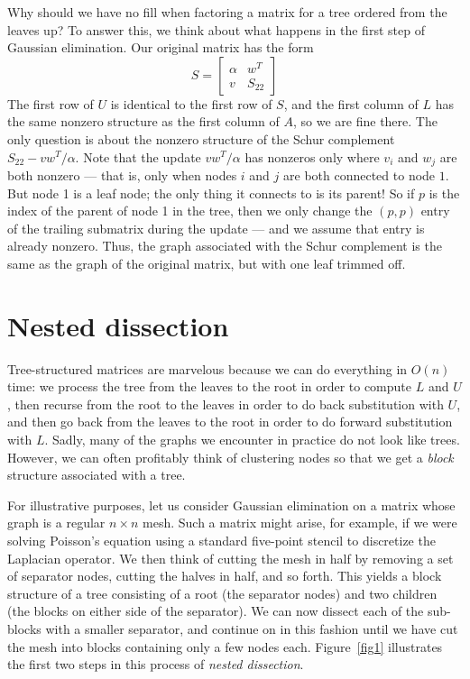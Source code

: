 \documentclass[12pt, leqno]{article}
\begin{document}
Why should we have no fill when factoring a matrix for a tree ordered
from the leaves up?  To answer this, we think about what happens in the
first step of Gaussian elimination.  Our original matrix has the form
\[
  S = \begin{bmatrix} \alpha & w^T \\ v & S_{22} \end{bmatrix}
\]
The first row of $U$ is identical to the first row of $S$,
and the first column of $L$ has the same nonzero structure
as the first column of $A$, so we are fine there.
The only question is about the nonzero structure of the Schur
complement $S_{22}-vw^T/\alpha$.  Note that the update $vw^T/\alpha$
has nonzeros only where $v_i$ and $w_j$ are both nonzero --- that is,
only when nodes $i$ and $j$ are both connected to node $1$.  But node
1 is a leaf node; the only thing it connects to is its parent!  So if
$p$ is the index of the parent of node 1 in the tree, then we only
change the $(p,p)$ entry of the trailing submatrix during the update
--- and we assume that entry is already nonzero.  Thus, the graph
associated with the Schur complement is the same as the graph of the
original matrix, but with one leaf trimmed off.

\section{Nested dissection}

Tree-structured matrices are marvelous because we can do everything in
$O(n)$ time: we process the tree from the leaves to the root in order
to compute $L$ and $U$, then recurse from the root to the leaves in
order to do back substitution with $U$, and then go back from the
leaves to the root in order to do forward substitution with $L$.
Sadly, many of the graphs we encounter in practice do not look like trees.
However, we can often profitably think of clustering nodes so that we get
a {\em block} structure associated with a tree.

For illustrative purposes, let us consider Gaussian elimination on a
matrix whose graph is a regular $n \times n$ mesh.  Such a matrix
might arise, for example, if we were solving Poisson's equation using
a standard five-point stencil to discretize the Laplacian operator.
We then think of cutting the mesh in half by removing a set of
separator nodes, cutting the halves in half, and so forth.  This
yields a block structure of a tree consisting of a root (the separator
nodes) and two children (the blocks on either side of the separator).
We can now dissect each of the sub-blocks with a smaller separator,
and continue on in this fashion until we have cut the mesh into blocks
containing only a few nodes each.  Figure~\ref{fig1} illustrates the
first two steps in this process of {\em nested dissection}.
\end{document}
